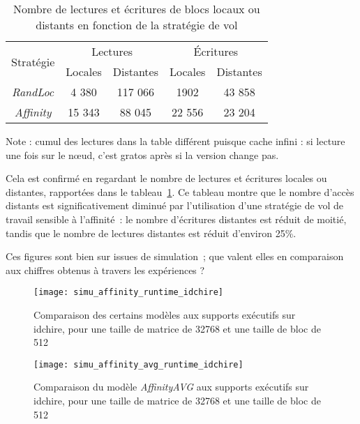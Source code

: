 \begin{table}[h!]
\def\arraystretch{1.5}
\centering
\begin{tabular}{|c||c|c|c|c|}\hline
  \multirow{2}{*}{Stratégie} & \multicolumn{2}{c|}{Lectures} & \multicolumn{2}{c|}{Écritures} \\ \cline{2-5}
    & Locales & Distantes & Locales & Distantes \\
  \hline
  \emph{RandLoc} & 4 380 & 117 066 & 1902 & 43 858 \\
  \hline
  \emph{Affinity} & 15 343 & 88 045 & 22 556 & 23 204 \\
  \hline
\end{tabular}
\caption{Nombre de lectures et écritures de blocs locaux ou distants en fonction de la stratégie de vol}\label{tab:simu:acces-blocs-idchire}
\end{table}
\begin{todo}
Note : cumul des lectures dans la table différent puisque cache infini : si lecture une fois sur le nœud, c'est gratos après si la version change pas.
\end{todo}

Cela est confirmé en regardant le nombre de lectures et écritures locales ou distantes, rapportées dans le tableau~\ref{tab:simu:acces-blocs-idchire}.
Ce tableau montre que le nombre d'accès distants est significativement diminué par l'utilisation d'une stratégie de vol de travail sensible à l'affinité~: le nombre d'écritures distantes est réduit de moitié, tandis que le nombre de lectures distantes est réduit d'environ 25\%.


Ces figures sont bien sur issues de simulation~; que valent elles en comparaison aux chiffres obtenus à travers les expériences ?

\begin{figure}[t!]
  \centering
  \texttt{[image: simu\_affinity\_runtime\_idchire]}
  \caption{Comparaison des certains modèles aux supports exécutifs sur idchire, pour une taille de matrice de 32768 et une taille de bloc de 512}\label{fig:simu:modeles-vs-runtime:idchire}
\end{figure}
\begin{figure}[h!]
  \centering
  \texttt{[image: simu\_affinity\_avg\_runtime\_idchire]}
  \caption{Comparaison du modèle \emph{AffinityAVG} aux supports exécutifs sur idchire, pour une taille de matrice de 32768 et une taille de bloc de 512}\label{fig:simu:affinityavg-vs-runtime:idchire}
\end{figure}


